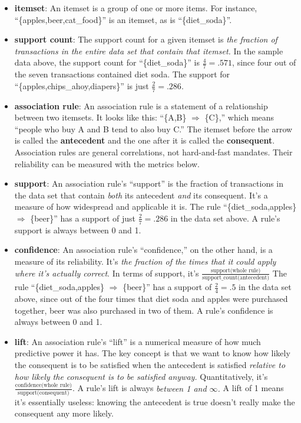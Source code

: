 \documentclass[12pt]{article}
\begin{document}
\begin{itemize}
\itemsep.1em

\item \textbf{itemset}: An itemset is a group of one or more items. For
instance, ``\{apples,beer,cat\_food\}'' is an itemset, as is
``\{diet\_soda\}''.

\item \textbf{support count}: The support count for a given itemset is
\textit{the fraction of transactions in the entire data set that contain that
itemset.} In the sample data above, the support count for ``\{diet\_soda\}'' is
$\frac{4}{7} = .571$, since four out of the seven transactions contained
diet soda. The support for ``\{apples,chips\_ahoy,diapers\}'' is just $\frac{2}{7}
= .286$.

\item \textbf{association rule}: An association rule is a statement of a
relationship between two itemsets. It looks like this: ``\{A,B\} $\Rightarrow$
\{C\},'' which means ``people who buy A and B tend to also buy C.'' The itemset
before the arrow is called the \textbf{antecedent} and the one after it is
called the \textbf{consequent}. Association
rules are general correlations, not hard-and-fast mandates. Their reliability
can be measured with the metrics below.

\item \textbf{support}: An association rule's ``support'' is the fraction of
transactions in the data set that contain \textit{both} its antecedent
\textit{and} its consequent. It's a measure of how widespread and applicable
it is. The rule ``\{diet\_soda,apples\} $\Rightarrow$ \{beer\}'' has a support of
just $\frac{2}{7} = .286$ in the data set above. A rule's support is always
between 0 and 1.

\item \textbf{confidence}: An association rule's ``confidence,'' on the other
hand, is a measure of its reliability. It's \textit{the fraction of the times
that it could apply where it's actually correct}. In terms of support, it's
$\frac{\textrm{support(whole rule)}}{\textrm{support\_count(antecedent)}}$
The rule ``\{diet\_soda,apples\} $\Rightarrow$ \{beer\}'' has a support of
$\frac{2}{4} = .5$ in the data set above, since out of the four times that
diet soda and apples were purchased together, beer was also purchased in two
of them. A rule's confidence is always between 0 and 1.

\item \textbf{lift}: An association rule's ``lift'' is a numerical measure of
how much predictive power it has. The key concept is that we want to know how
likely the consequent is to be satisfied when the antecedent is satisfied 
\textit{relative to how likely the consequent is to be satisfied anyway.}
Quantitatively, it's $\frac{\textrm{confidence(whole
rule)}}{\textrm{support(consequent)}}$. A rule's lift is always \textit{between 1 and
$\infty$.} A lift of 1 means it's essentially useless: knowing the antecedent
is true doesn't really make the consequent any more likely.
\end{itemize}
\end{document}
